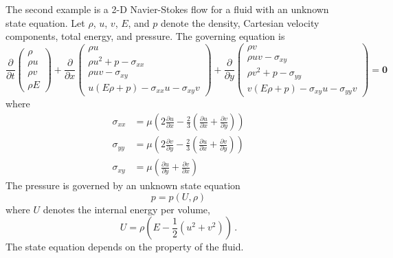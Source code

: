 \documentclass[a4paper,onecolumn]{article}
\theoremstyle{remark}
\begin{document}
\indent The second example is a 2-D Navier-Stokes flow for a fluid with an unknown state equation. 
Let $\rho$, $u$, $v$, $E$, and $p$ denote the density, Cartesian velocity components, 
total energy, and pressure.
The governing equation is
\begin{equation}
    \frac{\partial}{\partial t}
    \begin{pmatrix}
        \rho \\ \rho u \\ \rho v\\ \rho E
    \end{pmatrix}
    + \frac{\partial}{\partial x} 
    \begin{pmatrix}
        \rho u\\
        \rho u^2 + p - \sigma_{xx}\\
        \rho uv - \sigma_{xy}\\
        u(E\rho+p) - \sigma_{xx} u - \sigma_{xy} v
    \end{pmatrix}
    + \frac{\partial}{\partial y}
    \begin{pmatrix}
        \rho v\\
        \rho uv-\sigma_{xy}\\
        \rho v^2+p-\sigma_{yy}\\
        v(E\rho+p) - \sigma_{xy} u -\sigma_{yy}v
    \end{pmatrix} 
    = \boldsymbol{0}
    \label{NSeqn}
\end{equation}
where
\begin{equation}\begin{split}
    \sigma_{xx} &= \mu \left(2 \frac{\partial u}{\partial x} - \frac{2}{3} \left(\frac{\partial u}{\partial x} 
    + \frac{\partial v}{\partial y}\right)\right)\\
    \sigma_{yy} &= \mu \left(2 \frac{\partial v}{\partial y} - \frac{2}{3} \left(\frac{\partial u}{\partial x} 
    + \frac{\partial v}{\partial y}\right)\right)\\
    \sigma_{xy}&=\mu\left(\frac{\partial u}{\partial y} + \frac{\partial v}{\partial x}\right)
\end{split}\end{equation}
The pressure is governed by an unknown state equation
\begin{equation}
    p = p(U, \rho)
    \label{state equation}
\end{equation}
where $U$ denotes the internal energy per volume,
\begin{equation}
    U = \rho\left(E-\frac{1}{2}(u^2+v^2)\right)\,.
\end{equation}
The state equation depends on the property of the fluid.\\
\end{document}
